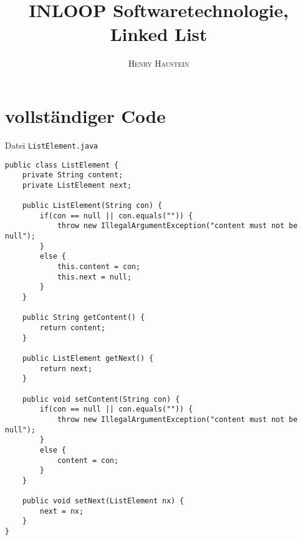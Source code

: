 \documentclass{article}
\title{\textbf{INLOOP Softwaretechnologie, Linked List}}
\author{\textsc{Henry Haustein}}
\date{}
\begin{document}
	\maketitle
	
	\section*{vollständiger Code}
	Datei \texttt{ListElement.java}
	\begin{lstlisting}[style=java,tabsize=2]
public class ListElement {
	private String content;
	private ListElement next;
	
	public ListElement(String con) {
		if(con == null || con.equals("")) {
			throw new IllegalArgumentException("content must not be null");
		}
		else {
			this.content = con;
			this.next = null;
		}
	}
	
	public String getContent() {
		return content;
	}
	
	public ListElement getNext() {
		return next;
	}
	
	public void setContent(String con) {
		if(con == null || con.equals("")) {
			throw new IllegalArgumentException("content must not be null");
		}
		else {
			content = con;
		}
	}
	
	public void setNext(ListElement nx) {
		next = nx;
	}
}
	\end{lstlisting}
\end{document}
